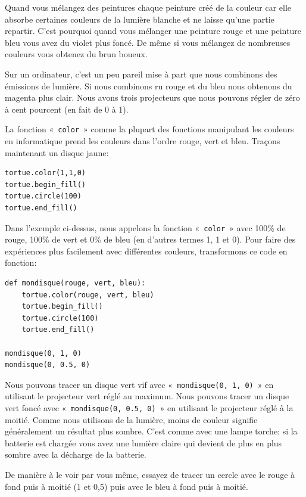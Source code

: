 Quand vous mélangez des peintures chaque peinture créé de la couleur car elle absorbe certaines couleurs de la lumière blanche et ne laisse qu'une partie repartir. C'est pourquoi quand vous mélanger une peinture rouge et une peinture bleu vous avez du violet plus foncé. De même si vous mélangez de nombreuses couleurs vous obtenez du brun boueux.
 
Sur un ordinateur, c'est un peu pareil mise à part que nous combinons des émissions de lumière. Si nous combinons ru rouge et du bleu nous obtenons du magenta plus clair.
Nous avons trois projecteurs que nous pouvons régler de zéro à cent pourcent (en fait de 0 à 1).

La fonction « \texttt{color} » comme la plupart des fonctions manipulant les couleurs en informatique prend les couleurs dans l'ordre rouge, vert et bleu. Traçons maintenant un disque jaune:

\begin{Verbatim}[frame=single,rulecolor=\color{mbleu}, label=à taper]
tortue.color(1,1,0)
tortue.begin_fill()
tortue.circle(100)
tortue.end_fill()
\end{Verbatim}

Dans l'exemple ci-dessus, nous appelons la fonction « \texttt{color} » avec 100\% de rouge, 100\% de vert et 0\% de bleu (en d'autres termes 1, 1 et 0). Pour faire des expériences plus facilement avec différentes couleurs, transformons ce code en fonction:
\begin{Verbatim}[frame=single,rulecolor=\color{mbleu}, label=à taper]
def mondisque(rouge, vert, bleu):
    tortue.color(rouge, vert, bleu)
    tortue.begin_fill()
    tortue.circle(100)
    tortue.end_fill()
    
mondisque(0, 1, 0)
mondisque(0, 0.5, 0)
\end{Verbatim}

Nous pouvons tracer un disque vert vif avec « \texttt{mondisque(0, 1, 0)} »  en utilisant le projecteur vert réglé au maximum. Nous pouvons tracer un disque vert foncé avec « \texttt{mondisque(0, 0.5, 0)} » en utilisant le projecteur réglé à la moitié. Comme nous utilisons de la lumière, moins de couleur signifie généralement un résultat plus sombre. C'est comme avec une lampe torche: si la batterie est chargée vous avez une lumière claire qui devient de plus en plus sombre avec la décharge de la batterie.

De manière à le voir par vous même, essayez de tracer un cercle avec le rouge à fond puis à moitié (1 et 0,5) puis avec le bleu à fond puis à moitié.

